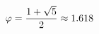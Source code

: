 \documentclass[preview]{standalone}
\begin{document}
\begin{align*}
\special{dvisvgm:raw <g id='unique000'>}\varphi = \frac{1 + \sqrt{5}}{2} \approx 1.618\special{dvisvgm:raw </g>}
\end{align*}
\end{document}
